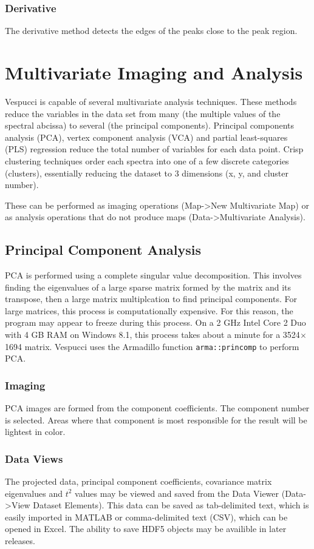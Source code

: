 \documentclass[12pt]{achemso} %
\begin{document}
\subsubsection{Derivative} The derivative method detects the edges of the peaks
close to the peak region.

\newpage 
\section{Multivariate Imaging and Analysis}
Vespucci is capable of several multivariate analysis techniques. These methods
reduce the variables in the data set from many (the multiple values of the
spectral abcissa) to several (the principal components). Principal components
analysis (PCA), vertex component analysis (VCA) and partial least-squares (PLS)
regression reduce the total number of variables for each data point. Crisp
clustering techniques order each spectra into one of a few discrete categories
(clusters), essentially reducing the dataset to 3 dimensions (x, y, and cluster
number).

These can be performed as imaging operations (Map->New Multivariate Map) or as
analysis operations that do not produce maps (Data->Multivariate Analysis).

\subsection{Principal Component Analysis} PCA is performed using a complete
singular value decomposition. This involves finding the eigenvalues of a large
sparse matrix formed by the matrix and its transpose, then a large matrix
multiplcation to find principal components. For large matrices, this process is
computationally expensive. For this reason, the program may appear to freeze
during this process. On a 2 GHz Intel Core 2 Duo with 4 GB RAM on Windows 8.1,
this process takes about a minute for a 3524\(\times\)1694 matrix. Vespucci uses
the Armadillo function \texttt{arma::princomp} to perform PCA.

\subsubsection{Imaging} PCA images are formed from the component coefficients.
The component number is selected. Areas where that component is most responsible
for the result will be lightest in color.

\subsubsection{Data Views} The projected data, principal component coefficients,
covariance matrix eigenvalues and \(t^2\) values may be viewed and saved from
the Data Viewer (Data->View Dataset Elements). This data can be saved as
tab-delimited text, which is easily imported in MATLAB or comma-delimited text
(CSV), which can be opened in Excel. The ability to save HDF5 objects may be
availible in later releases.
\end{document}

